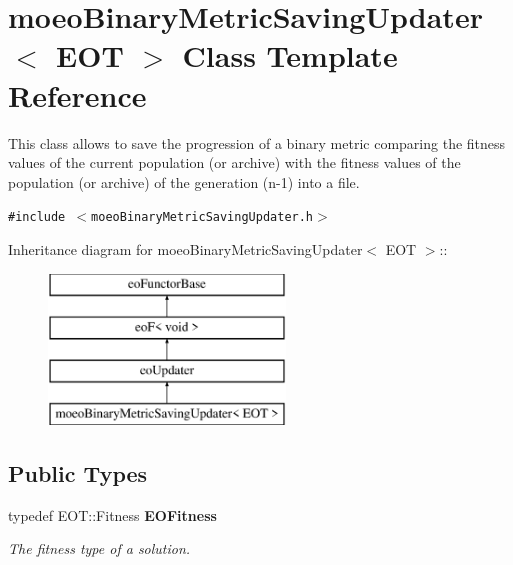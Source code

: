 \section{moeo\-Binary\-Metric\-Saving\-Updater$<$ EOT $>$ Class Template Reference}
\label{classmoeoBinaryMetricSavingUpdater}
This class allows to save the progression of a binary metric comparing the fitness values of the current population (or archive) with the fitness values of the population (or archive) of the generation (n-1) into a file.  


{\tt \#include $<$moeo\-Binary\-Metric\-Saving\-Updater.h$>$}

Inheritance diagram for moeo\-Binary\-Metric\-Saving\-Updater$<$ EOT $>$::\begin{figure}[H]
\begin{center}
\leavevmode
\includegraphics[height=4cm]{classmoeoBinaryMetricSavingUpdater}
\end{center}
\end{figure}
\subsection*{Public Types}
\begin{CompactItemize}
\item 
typedef EOT::Fitness {\bf EOFitness}\label{classmoeoBinaryMetricSavingUpdater_c22e390633d94bbf69309e8d0cae1f0a}

\begin{CompactList}\small\item\em The fitness type of a solution. \item\end{CompactList}\end{CompactItemize}
